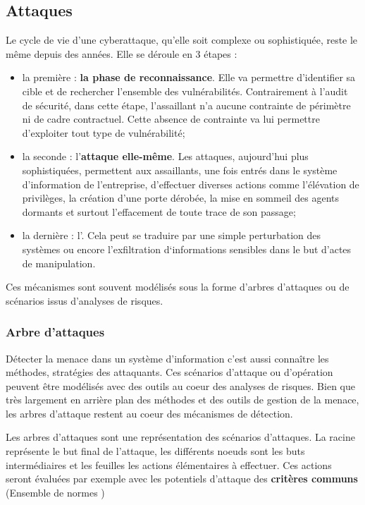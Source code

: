 \subsection{Attaques}

Le cycle de vie d’une cyberattaque, qu’elle soit complexe ou sophistiquée, reste le même depuis des années. Elle se déroule en 3 étapes :
\begin{itemize}
  \item la première : \textbf{la phase de reconnaissance}. Elle va permettre d’identifier sa cible et de rechercher l’ensemble des vulnérabilités. Contrairement à l’audit de sécurité, dans cette étape, l’assaillant n’a aucune contrainte de périmètre ni de cadre contractuel. Cette absence de contrainte va lui permettre d’exploiter tout type de vulnérabilité;
  \item la seconde : l’\textbf{attaque elle-même}. Les attaques, aujourd’hui plus sophistiquées, permettent aux assaillants, une fois entrés dans le système d’information de l’entreprise, d’effectuer diverses actions comme l’élévation de privilèges, la création d’une porte dérobée, la mise en sommeil des agents dormants et surtout l’effacement de toute trace de son passage;
  \item  la dernière : l’. Cela peut se traduire par une simple perturbation des systèmes ou encore l’exfiltration d‘informations sensibles dans le but d’actes de manipulation.
\end{itemize}

Ces mécanismes sont souvent modélisés sous la forme d'arbres d'attaques ou de scénarios issus d'analyses de risques.

\subsubsection{Arbre d'attaques} 

\label{sec:arbreattaques}


Détecter la menace dans un système d'information c'est aussi connaître les méthodes, stratégies des attaquants. Ces scénarios d'attaque ou d'opération peuvent être modélisés avec des outils au coeur des analyses de risques. Bien que très largement en arrière plan des méthodes et des outils de gestion de la menace, les arbres d'attaque restent au coeur des mécanismes de détection.

Les arbres d'attaques sont une représentation des scénarios d'attaques. La racine représente le but final de l'attaque, les différents noeuds sont les buts intermédiaires et les feuilles les actions élémentaires à effectuer. Ces actions seront évaluées par exemple avec les potentiels d'attaque des \textbf{critères communs} (Ensemble de normes )

